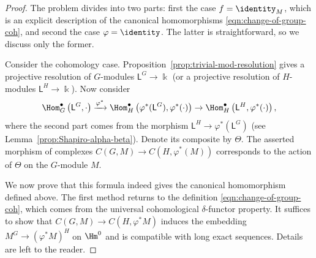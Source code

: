 \begin{proof}
	The problem divides into two parts: first the case $f=\identity_M$, which
	is an explicit description of the canonical homomorphisms
	\eqref{eqn:change-of-group-coh}, and second the case
	$\varphi=\identity$. The latter is straightforward, so we discuss only
	the former.

	Consider the cohomology case. Proposition~\ref{prop:trivial-mod-resolution}
	gives a projective resolution of $G$-modules
	$\mathsf{L}^G\to\Bbbk$ (or a projective resolution of $H$-modules
	$\mathsf{L}^H\to\Bbbk$). Now consider
	\[ \Hom^\bullet_G \left( \mathsf{L}^G, \cdot\right) \xrightarrow{\varphi^*} \Hom^\bullet_H\left( \varphi^* (\mathsf{L}^G), \varphi^*(\cdot)\right) \to \Hom^\bullet_H\left(\mathsf{L}^H, \varphi^*(\cdot)\right), \]
	where the second part comes from the morphism
	$\mathsf{L}^H\to\varphi^*(\mathsf{L}^G)$
	(see Lemma~\ref{prop:Shapiro-alpha-beta}). Denote its composite by
	$\Theta$. The asserted morphism of complexes
	$C(G,M)\to C(H,\varphi^*(M))$ corresponds to the action of $\Theta$ on
	the $G$-module $M$.

	We now prove that this formula indeed gives the canonical homomorphism
	defined above. The first method returns to the definition
	\eqref{eqn:change-of-group-coh}, which comes from the universal
	cohomological $\delta$-functor property. It suffices to show that
	$C(G,M)\to C(H,\varphi^*M)$ induces the embedding
	$M^G\to(\varphi^*M)^H$ on $\Hm^0$ and is compatible with long exact
	sequences. Details are left to the reader.


\end{proof}
